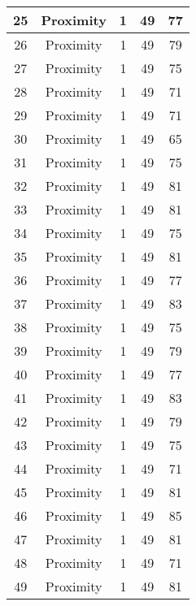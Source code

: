 \documentclass[results.tex]{subfiles}
\begin{document}
\begin{center}
\begin{tabular}{| c || c | c | c | c |}
    \hline
    25 & Proximity & 1 & 49 & 77 \\ 
    \hline
    26 & Proximity & 1 & 49 & 79 \\ 
    \hline
    27 & Proximity & 1 & 49 & 75 \\ 
    \hline
    28 & Proximity & 1 & 49 & 71 \\ 
    \hline
    29 & Proximity & 1 & 49 & 71 \\ 
    \hline
    30 & Proximity & 1 & 49 & 65 \\ 
    \hline
    31 & Proximity & 1 & 49 & 75 \\ 
    \hline
    32 & Proximity & 1 & 49 & 81 \\ 
    \hline
    33 & Proximity & 1 & 49 & 81 \\ 
    \hline
    34 & Proximity & 1 & 49 & 75 \\ 
    \hline
    35 & Proximity & 1 & 49 & 81 \\ 
    \hline
    36 & Proximity & 1 & 49 & 77 \\ 
    \hline
    37 & Proximity & 1 & 49 & 83 \\ 
    \hline
    38 & Proximity & 1 & 49 & 75 \\ 
    \hline
    39 & Proximity & 1 & 49 & 79 \\ 
    \hline
    40 & Proximity & 1 & 49 & 77 \\ 
    \hline
    41 & Proximity & 1 & 49 & 83 \\ 
    \hline
    42 & Proximity & 1 & 49 & 79 \\ 
    \hline
    43 & Proximity & 1 & 49 & 75 \\ 
    \hline
    44 & Proximity & 1 & 49 & 71 \\ 
    \hline
    45 & Proximity & 1 & 49 & 81 \\ 
    \hline
    46 & Proximity & 1 & 49 & 85 \\ 
    \hline
    47 & Proximity & 1 & 49 & 81 \\ 
    \hline
    48 & Proximity & 1 & 49 & 71 \\ 
    \hline
    49 & Proximity & 1 & 49 & 81 \\ 
    \hline   \end{tabular}
\end{center}
\end{document}
